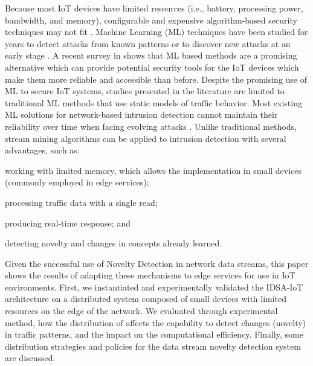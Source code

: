 Because most IoT devices have limited resources (i.e., battery, processing
power, bandwidth, and memory), configurable and expensive algorithm-based
security techniques may not fit %
\cite{Zhou2017}.
Machine Learning (ML) techniques have been studied for years to detect attacks
from known patterns or to discover new attacks at an early stage
\cite{buczak2016survey,mitchell2014survey}.
A recent survey in \cite{Tahsien2020} shows that ML based methods are a
promising alternative which can provide potential security tools for the IoT
devices which make them more reliable and accessible than before.
Despite the promising use of ML to secure IoT systems, %
studies presented in the literature %
\cite{buczak2016survey,mitchell2014survey,Tahsien2020} %
are limited to
traditional ML methods that use static models of traffic behavior.
Most existing ML solutions for network-based intrusion detection cannot maintain
their reliability over time when facing evolving attacks \cite{Viegas2019}.
Unlike traditional methods, stream mining algorithms can be applied to intrusion
detection with several advantages, such as:
\begin{enumerate*}[label=(\emph{\roman*})]
    \item working with limited memory, which allows the implementation in small
    devices (commonly employed in edge services);
    \item processing traffic data with a single read;
    \item producing real-time response; and
    \item detecting novelty and changes in concepts already learned.
\end{enumerate*}

Given the successful
use of Novelty Detection in network data streams,
this paper shows the results of adapting these mechanisms to edge services
for use in IoT environments.
First, we instantiated and experimentally validated the IDSA-IoT
architecture \cite{Cassales2019a} on a distributed system
composed of small devices with limited resources on the edge of the network.
We evaluated through experimental method, how the distribution of
\minas
affects the capability to detect changes (novelty) in
traffic patterns, and the impact on the computational efficiency.
Finally, some distribution strategies and policies for the data stream
novelty detection system are discussed.

